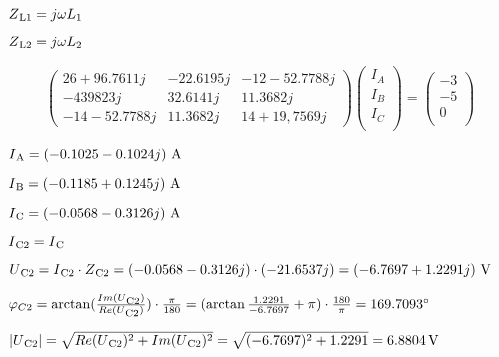 $Z\textsubscript{L1} =  j\omega L\textsubscript{1} \\$

$Z\textsubscript{L2} =  j\omega L\textsubscript{2}\\$

\begin{align*}
    \begin{pmatrix}
        26 + 96.7611j&-22.6195j &-12 -52.7788j\\
        -439823j&32.6141j&11.3682j\\ 
        -14 - 52.7788j&11.3682j&14 + 19,7569j
    \end{pmatrix}
    \begin{pmatrix}
        I_{A}\\
        I_{B}\\
        I_{C}\\
        \end{pmatrix}
          =
        \begin{pmatrix}
        -3\\
        -5\\
        0\\
        \end{pmatrix}
\end{align*}
	
$I\textsubscript{A} = (-0.1025 - 0.1024j)\ \si{\ampere} \\$

$I\textsubscript{B} = (-0.1185 + 0.1245j)\ \si{\ampere} \\$

$\I{C} = (-0.0568 - 0.3126j)\ \si{\ampere}\\$

	
$I\textsubscript{C2} = I\textsubscript{C}\\$

$U\textsubscript{C2} = I\textsubscript{C2} \cdot Z\textsubscript{C2} = (-0.0568 - 0.3126j) \cdot (-21.6537j) = (-6.7697 + 1.2291j)\ \si{\volt} \\$

$\varphi_{C2}= \arctan(\frac{Im(U\textsubscript{C2})}{Re(U\textsubscript{C2})}) \cdot \frac{\pi}{180}  = (\arctan\frac{1.2291}{-6.7697} + \pi)\cdot\frac{180}{\pi} = 169.7093^\circ \\$

$|U\textsubscript{C2}| = \sqrt{Re(U\textsubscript{C2})^2 + Im(U\textsubscript{C2})^2} = \sqrt{(-6.7697)^2 + 1.2291} = \SI{6.8804}{\volt}$